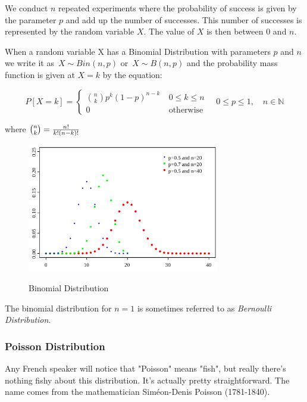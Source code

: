   We conduct $n$ repeated experiments where the probability of success is given by the parameter $p$ and add up the number of successes. This number of successes is represented by the random variable $X$.  The value of $X$ is then between 0 and $n$.

When a random variable X has a Binomial Distribution with parameters $p$ and $n$ we write it as $\,X \sim Bin(n,p)$ or $\,X \sim B(n,p)$ and the probability mass function is given at $X=k$ by the equation:

\begin{equation}
    P\left[X = k\right] = \begin{cases} {n \choose k} p^k \left(1-p\right)^{n-k}\ & 0 \le k \le n \\ 0 & \mbox{otherwise} \end{cases} \quad 0 \leq p \leq 1, \quad n \in \mathbb{N}
\end{equation}

where ${n \choose k}={n! \over k!(n-k)!}$

\begin{figure}
  \centering
  \includegraphics[width=0.75\textwidth]{../Images/Binomial_distribution_pmf.png}\\
  \caption{Binomial Distribution}
\end{figure}

The binomial distribution for $n = 1$ is sometimes referred to as \emph{Bernoulli Distribution}. 

\subsubsection{Poisson Distribution}

Any French speaker will notice that "Poisson" means "fish", but really there's nothing fishy about this distribution. It's actually pretty straightforward. The name comes from the mathematician Siméon-Denis Poisson (1781-1840).

